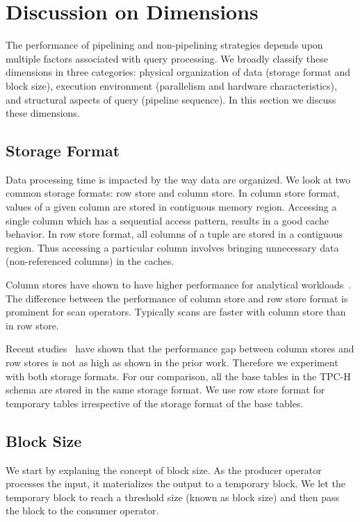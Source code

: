 \section{Discussion on Dimensions}\label{sec:dimensions}
The performance of pipelining and non-pipelining strategies depends upon multiple factors associated with query processing.
We broadly classify these dimensions in three categories: physical organization of data (storage format and block size), execution environment (parallelism and hardware characteristics), and structural aspects of query (pipeline sequence).
In this section we discuss these dimensions.

\subsection{Storage Format}
Data processing time is impacted by the way data are organized.
We look at two common storage formats: row store and column store.
In column store format, values of a given column are stored in contiguous memory region.
Accessing a single column which has a sequential access pattern, results in a good cache behavior.
In row store format, all columns of a tuple are stored in a contiguous region. 
Thus accessing a particular column involves bringing unnecessary data (non-referenced columns) in the caches. 

Column stores have shown to have higher performance for analytical workloads~\cite{DBLP:conf/sigmod/AbadiMH08}. 
The difference between the performance of column store and row store format is prominent for scan operators.
Typically scans are faster with column store than in row store.

Recent studies~\cite{quickstep-system} have shown that the performance gap between column stores and row stores is not as high as shown in the prior work.
Therefore we experiment with both storage formats. 
For our comparison, all the base tables in the TPC-H schema are stored in the same storage format.
We use row store format for temporary tables irrespective of the storage format of the base tables.

\subsection{Block Size}
We start by explaning the concept of block size.
As the producer operator processes the input, it materializes the output to a temporary block. 
We let the temporary block to reach a threshold size (known as block size) and then pass the block to the consumer operator. 

